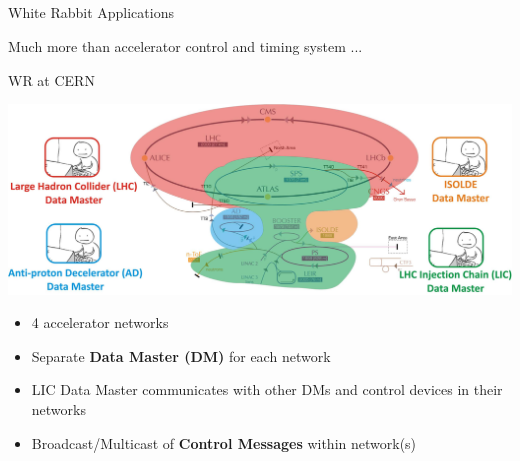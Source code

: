 \documentclass[compress,red]{beamer}
\begin{document}
\subsection{}
\begin{frame}{White Rabbit Applications}

    \begin{center}
      Much more than accelerator control and timing system ...
    \end{center}


\end{frame}
\begin{frame}{WR at CERN}

      \begin{center}
      \includegraphics[width=.7\textwidth]{applications/CERN/accNetworks.pdf}
      \end{center}

  \begin{itemize}
    \item 4 accelerator networks
    \item Separate {\bf Data Master (DM)} for each network
    \item \textcolor{green!90}{LIC Data Master} communicates with other DMs and control devices in their networks
    \item Broadcast/Multicast of {\bf Control Messages} within network(s)
  \end{itemize}

\end{frame}
\end{document}
